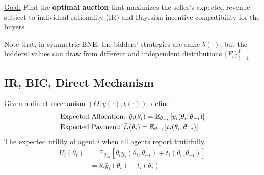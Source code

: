 \documentclass[11pt]{elegantbook_2}
\begin{document}
\begin{comment}
\begin{corollary}[Standard Revenue Equivalence Theorem]
    Suppose that values are \underline{i.i.d.} and bidders are \underline{risk-neutral}.\\
    Consider any auction and its \underline{symmetric} and \underline{increasing} equilibrium, in which the expected payment of bidders have $0$ value is $0$. Then the expected revenue to the seller is the \underline{same}.
\end{corollary}
\begin{proof}
    If equilibrium, is symmetric and increasing, then object is \underline{always} allocated to the bidder with the highest value. Set $t_i(0)=0$.
\end{proof}

Standard Revenue Equivalence Theorem is based on \underline{symmetric}, \underline{independent}, and \underline{private} (uncorrelated) values.
\end{comment}

















\underline{Goal:} Find the \textbf{optimal auction} that maximizes the seller's expected revenue subject to individual rationality (IR) and Bayesian incentive compatibility for the buyers.


\begin{note}
    Note that, in symmetric BNE, the bidders' strategies are same $b(\cdot)$, but the bidders' values can draw from different and independent distributions $\{F_i\}_{i=1}^I$
\end{note}


\subsection{IR, BIC, Direct Mechanism}
Given a direct mechanism $\left(\Theta,y(\cdot),t(\cdot)\right)$, define
\begin{equation}
    \begin{aligned}
        &\textnormal{Expected Allocation: } \bar{y}_i(\theta_i)=\mathbb{E}_{\theta_{-i}}\left[y_i(\theta_i,\theta_{-i})\right]\\
        &\textnormal{Expected Payment: } \bar{t}_i(\theta_i)=\mathbb{E}_{\theta_{-i}}\left[t_i(\theta_i,\theta_{-i})\right]
    \end{aligned}
    \nonumber
\end{equation}
The expected utility of agent $i$ when all agents report truthfully,
\begin{equation}
    \begin{aligned}
        U_i(\theta_i)&=\mathbb{E}_{\theta_{-i}}\left[\theta_iy_i(\theta_i,\theta_{-i})+t_i(\theta_i,\theta_{-i})\right]\\
        &=\theta_i \bar{y}_i(\theta_i)+\bar{t}_i(\theta_i)
    \end{aligned}
    \nonumber
\end{equation}
\end{document}
